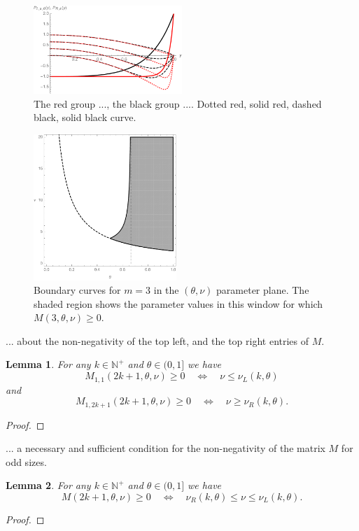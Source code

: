 \documentclass[a4paper]{article}
\newtheorem{lemma}{Lemma}
\newcommand{\te}{\theta}
\newcommand{\nul}{\nu_L(k,\theta)}
\newcommand{\nur}{\nu_R(k,\theta)}
\newcommand{\nplus}{\mathbb{N}^+}
\begin{document}
\begin{figure}
\begin{center}
\includegraphics[width=0.5\textwidth]{fig_someplpr.pdf}
\caption{The red group ..., the black group .... Dotted red, solid red, dashed black, solid black curve.}\label{fig_someplpr}
\end{center}
\end{figure}

\begin{figure}
\begin{center}
\includegraphics[width=0.48\textwidth]{fig_boundary.pdf}
\caption{Boundary curves for $m=3$ in the $(\te,\nu)$ parameter plane. The shaded region shows the parameter values in this window for which $M(3,\te,\nu)\ge 0$.}\label{fig_boundary}
\end{center}
\end{figure}

... about the non-negativity of the top left, and the top right entries of $M$.
\begin{lemma}
For any $k\in\nplus$ and $\te\in(0,1]$ we have 
\[
M_{1,1}(2k+1,\te,\nu)\ge 0 \quad \Longleftrightarrow \quad \nu\le\nul
\] 
and
\[
M_{1,2k+1}(2k+1,\te,\nu)\ge 0 \quad \Longleftrightarrow \quad \nu\ge\nur.
\] 
\end{lemma}
\begin{proof}
\end{proof}



... a necessary and sufficient condition for the non-negativity of the matrix $M$ for odd sizes.
\begin{lemma}
For any $k\in\nplus$ and $\te\in(0,1]$ we have 
\[
M(2k+1,\te,\nu)\ge 0 \quad \Longleftrightarrow \quad \nur\le\nu\le\nul.
\] 
\end{lemma}
\begin{proof}
\end{proof}
\end{document}
